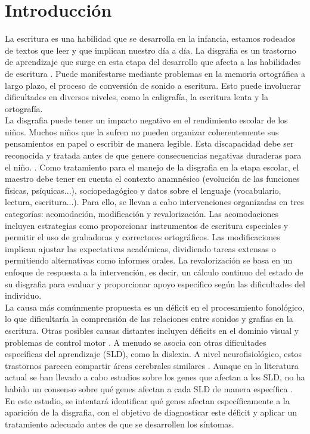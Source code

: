 \section{Introducción}
La escritura es una habilidad que se desarrolla en la infancia, estamos rodeados de textos que leer y que implican nuestro día a día. La disgrafia es un trastorno de aprendizaje que surge en esta etapa del desarrollo que afecta a las habilidades de escritura \cite{Chung2015}. Puede manifestarse mediante problemas en la memoria ortográfica a largo plazo, el proceso de conversión de sonido a escritura. Esto puede involucrar dificultades en diversos niveles, como la caligrafía, la escritura lenta y la ortografía.\\


La disgrafia puede tener un impacto negativo en el rendimiento escolar de los niños. Muchos niños que la sufren no pueden organizar coherentemente sus pensamientos en papel o escribir de manera legible. Esta discapacidad debe ser reconocida y tratada antes de que genere consecuencias negativas duraderas para el niño. \cite{Crouch2007}. Como tratamiento para el manejo de la disgrafia en la etapa escolar, el maestro debe tener en cuenta el contexto anamnésico (evolución de las funciones físicas, psíquicas...), sociopedagógico y datos sobre el lenguaje (vocabulario, lectura, escritura...)\cite{Santana}. Para ello, se llevan a cabo intervenciones organizadas en tres categorías: acomodación, modificación y revalorización\cite{Chung2015}. Las acomodaciones incluyen estrategias como proporcionar instrumentos de escritura especiales y permitir el uso de grabadoras y correctores ortográficos. Las modificaciones implican ajustar las expectativas académicas, dividiendo tareas extensas o permitiendo alternativas como informes orales. La revalorización se basa en un enfoque de respuesta a la intervención, es decir, un cálculo continuo del estado de su disgrafia para evaluar y proporcionar apoyo específico según las dificultades del individuo.\\


La causa más comúnmente propuesta es un déficit en el procesamiento fonológico, lo que dificultaría la comprensión de las relaciones entre sonidos y grafías en la escritura. Otras posibles causas distantes incluyen déficits en el dominio visual y problemas de control motor \cite{McCloskey2017}. A menudo se asocia con otras dificultades específicas del aprendizaje (SLD), como la dislexia. A nivel neurofisiológico, estos trastornos parecen compartir áreas cerebrales similares \cite{Marek2020, Nicolson2011}. Aunque en la literatura actual se han llevado a cabo estudios sobre los genes que afectan a los SLD, no ha habido un consenso sobre qué genes afectan a cada SLD de manera específica \cite{Abbott2017, Berninger2010}. En este estudio, se intentará identificar qué genes afectan específicamente a la aparición de la disgrafia, con el objetivo de diagnosticar este déficit y aplicar un tratamiento adecuado antes de que se desarrollen los síntomas. \\